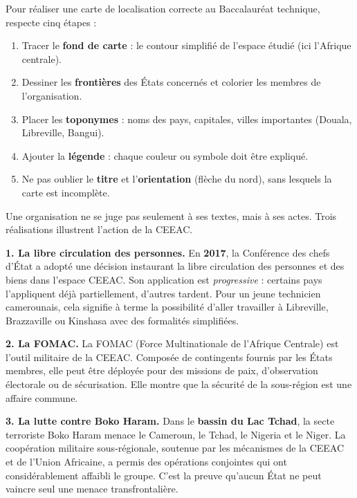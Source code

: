 \documentclass[11pt]{article}
\newcommand{\cle}[1]{{\popxbold\color{popdark}#1}}
\newcounter{popsec}
\newcounter{popsub}
\newcommand{\courssub}[1]{%
  \stepcounter{popsub}%
  \par\vspace{9pt}\noindent{\popxbold\fontsize{11.5}{13}\selectfont\color{popink}{\color{poporange}\thepopsec.\thepopsub}\hspace{6pt}#1}\par\nopagebreak\vspace{4pt}
}
\begin{document}
\begin{methode}
Pour réaliser une carte de localisation correcte au Baccalauréat technique, respecte cinq étapes :
\begin{enumerate}
\item Tracer le \textbf{fond de carte} : le contour simplifié de l'espace étudié (ici l'Afrique centrale).
\item Dessiner les \textbf{frontières} des États concernés et colorier les membres de l'organisation.
\item Placer les \textbf{toponymes} : noms des pays, capitales, villes importantes (Douala, Libreville, Bangui).
\item Ajouter la \textbf{légende} : chaque couleur ou symbole doit être expliqué.
\item Ne pas oublier le \textbf{titre} et l'\textbf{orientation} (flèche du nord), sans lesquels la carte est incomplète.
\end{enumerate}
\end{methode}

\courssub{Les actions concrètes de la CEEAC}

Une organisation ne se juge pas seulement à ses textes, mais à ses actes. Trois réalisations illustrent l'action de la CEEAC.

\textbf{1. La libre circulation des personnes.} En \textbf{2017}, la Conférence des chefs d'État a adopté une décision instaurant la libre circulation des personnes et des biens dans l'espace CEEAC. Son application est \emph{progressive} : certains pays l'appliquent déjà partiellement, d'autres tardent. Pour un jeune technicien camerounais, cela signifie à terme la possibilité d'aller travailler à Libreville, Brazzaville ou Kinshasa avec des formalités simplifiées.

\textbf{2. La FOMAC.} La \cle{FOMAC} (Force Multinationale de l'Afrique Centrale) est l'outil militaire de la CEEAC. Composée de contingents fournis par les États membres, elle peut être déployée pour des missions de paix, d'observation électorale ou de sécurisation. Elle montre que la sécurité de la sous-région est une affaire commune.

\textbf{3. La lutte contre Boko Haram.} Dans le \textbf{bassin du Lac Tchad}, la secte terroriste Boko Haram menace le Cameroun, le Tchad, le Nigeria et le Niger. La coopération militaire sous-régionale, soutenue par les mécanismes de la CEEAC et de l'Union Africaine, a permis des opérations conjointes qui ont considérablement affaibli le groupe. C'est la preuve qu'aucun État ne peut vaincre seul une menace transfrontalière.
\end{document}

